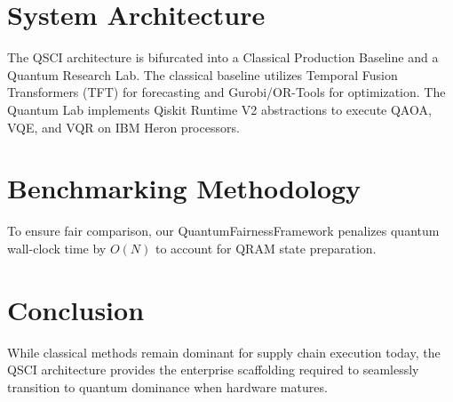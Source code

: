 \documentclass[conference]{IEEEtran}
\begin{document}
\section{System Architecture}
The QSCI architecture is bifurcated into a Classical Production Baseline and a Quantum Research Lab. The classical baseline utilizes Temporal Fusion Transformers (TFT) for forecasting and Gurobi/OR-Tools for optimization. The Quantum Lab implements Qiskit Runtime V2 abstractions to execute QAOA, VQE, and VQR on IBM Heron processors.

\section{Benchmarking Methodology}
To ensure fair comparison, our QuantumFairnessFramework penalizes quantum wall-clock time by $O(N)$ to account for QRAM state preparation.

\section{Conclusion}
While classical methods remain dominant for supply chain execution today, the QSCI architecture provides the enterprise scaffolding required to seamlessly transition to quantum dominance when hardware matures.
\end{document}
